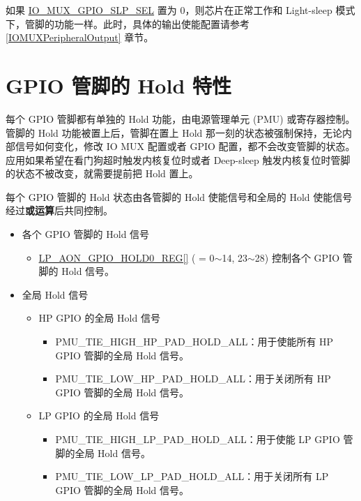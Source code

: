 \documentclass[main\_\_CN.tex]{subfiles}
\begin{document}
\begin{tiplisting}
如果 \hyperref[fielddesc:IOMUXGPIONSLPSEL]{IO\_MUX\_GPIO\_SLP\_SEL} 置为 0，则芯片在正常工作和 Light-sleep 模式下，管脚的功能一样。此时，具体的输出使能配置请参考 \ref{IOMUXPeripheralOutput} 章节。

\end{tiplisting}

\section{GPIO 管脚的 Hold 特性}\label{PadHold}

每个 GPIO 管脚都有单独的 Hold 功能，由电源管理单元 (PMU) 或寄存器控制。管脚的 Hold 功能被置上后，管脚在置上 Hold 那一刻的状态被强制保持，无论内部信号如何变化，修改 IO MUX 配置或者 GPIO 配置，都不会改变管脚的状态。应用如果希望在看门狗超时触发内核复位时或者 Deep-sleep 触发内核复位时管脚的状态不被改变，就需要提前把 Hold 置上。

每个 GPIO 管脚的 Hold 状态由各管脚的 Hold 使能信号和全局的 Hold 使能信号经过\textbf{或运算}后共同控制。
\begin{itemize}
    \item 各个 GPIO 管脚的 Hold 信号
    \begin{itemize}
        \item \hyperref[regdesc:LPAONGPIOHOLD0REG]{LP\_AON\_GPIO\_HOLD0\_REG[]} ( = 0$\sim$14, 23$\sim$28) 控制各个 GPIO 管脚的 Hold 信号。
        \end{itemize}
    \item 全局 Hold 信号
        \begin{itemize}
            \item HP GPIO 的全局 Hold 信号
            \begin{itemize}
                \item PMU\_TIE\_HIGH\_HP\_PAD\_HOLD\_ALL：用于使能所有 HP GPIO 管脚的全局 Hold 信号。
                \item PMU\_TIE\_LOW\_HP\_PAD\_HOLD\_ALL：用于关闭所有 HP GPIO 管脚的全局 Hold 信号。
            \end{itemize}
            \item LP GPIO 的全局 Hold 信号
            \begin{itemize}
                \item PMU\_TIE\_HIGH\_LP\_PAD\_HOLD\_ALL：用于使能 LP GPIO 管脚的全局 Hold 信号。
                \item PMU\_TIE\_LOW\_LP\_PAD\_HOLD\_ALL：用于关闭所有 LP GPIO 管脚的全局 Hold 信号。
            \end{itemize}
        \end{itemize}
    \end{itemize}
\end{document}
